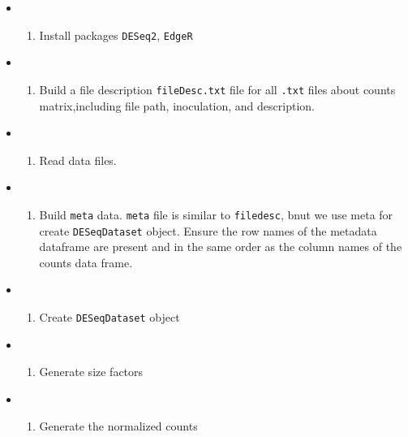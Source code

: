 \documentclass[
]{article}
\providecommand{\tightlist}{%
  \setlength{\itemsep}{0pt}\setlength{\parskip}{0pt}}
\begin{document}
\begin{itemize}
\tightlist
\item
  \begin{enumerate}
  \def\labelenumi{\arabic{enumi}.}
  \tightlist
  \item
    Install packages \texttt{DESeq2}, \texttt{EdgeR}
  \end{enumerate}
\item
  \begin{enumerate}
  \def\labelenumi{\arabic{enumi}.}
  \setcounter{enumi}{1}
  \tightlist
  \item
    Build a file description \texttt{fileDesc.txt} file for all
    \texttt{.txt} files about counts matrix,including file path,
    inoculation, and description.
  \end{enumerate}
\item
  \begin{enumerate}
  \def\labelenumi{\arabic{enumi}.}
  \setcounter{enumi}{2}
  \tightlist
  \item
    Read data files.
  \end{enumerate}
\item
  \begin{enumerate}
  \def\labelenumi{\arabic{enumi}.}
  \setcounter{enumi}{3}
  \tightlist
  \item
    Build \texttt{meta} data. \texttt{meta} file is similar to
    \texttt{filedesc}, bnut we use meta for create \texttt{DESeqDataset}
    object. Ensure the row names of the metadata dataframe are present
    and in the same order as the column names of the counts data frame.
  \end{enumerate}
\item
  \begin{enumerate}
  \def\labelenumi{\arabic{enumi}.}
  \setcounter{enumi}{4}
  \tightlist
  \item
    Create \texttt{DESeqDataset} object
  \end{enumerate}
\item
  \begin{enumerate}
  \def\labelenumi{\arabic{enumi}.}
  \setcounter{enumi}{5}
  \tightlist
  \item
    Generate size factors
  \end{enumerate}
\item
  \begin{enumerate}
  \def\labelenumi{\arabic{enumi}.}
  \setcounter{enumi}{6}
  \tightlist
  \item
    Generate the normalized counts
  \end{enumerate}
\end{itemize}
\end{document}
